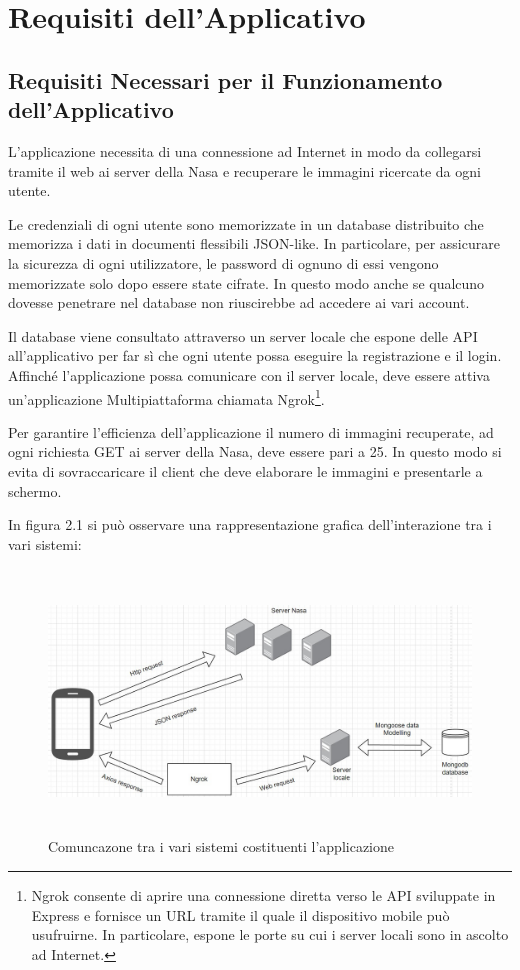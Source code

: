 \section{Requisiti dell'Applicativo}
\subsection{Requisiti Necessari per il Funzionamento dell'Applicativo}

L'applicazione necessita di una connessione ad Internet in modo da collegarsi
tramite il web ai server della Nasa e recuperare le immagini ricercate da ogni utente.

Le credenziali di ogni utente sono memorizzate in un database distribuito che memorizza i dati in documenti flessibili JSON-like. In particolare, per assicurare la sicurezza di ogni utilizzatore, le password di ognuno di essi vengono memorizzate
solo dopo essere state cifrate. In questo modo anche se qualcuno dovesse penetrare nel database non riuscirebbe ad accedere ai vari account.

Il database viene consultato attraverso un server locale che espone delle API all'applicativo per far s\`i che ogni utente possa eseguire la registrazione e il login.
Affinch\'e l'applicazione possa comunicare con il server locale, deve essere attiva un'applicazione Multipiattaforma chiamata Ngrok\footnote{Ngrok consente di aprire una connessione diretta verso le API sviluppate in Express e fornisce un URL tramite il quale il dispositivo mobile pu\`o usufruirne. In particolare, espone le porte su cui i server locali sono in ascolto ad Internet.}.


Per garantire l'efficienza dell'applicazione il numero di immagini recuperate, ad ogni richiesta GET ai server della Nasa, deve essere pari a 25. In questo modo si evita di sovraccaricare il client che deve elaborare le immagini e presentarle a schermo.

In figura 2.1 si pu\`o osservare una rappresentazione grafica dell'interazione tra i vari sistemi:
\begin{figure}[h]
    \centering
    \includegraphics[width=13cm, height=7cm]{images/ModelloDiComunicazioneApplicazione.jpg}
    \caption[differenzeiteot]{Comuncazone tra i vari sistemi costituenti l'applicazione}
    \label{fig:modellodicomunicazione}
\end{figure}
